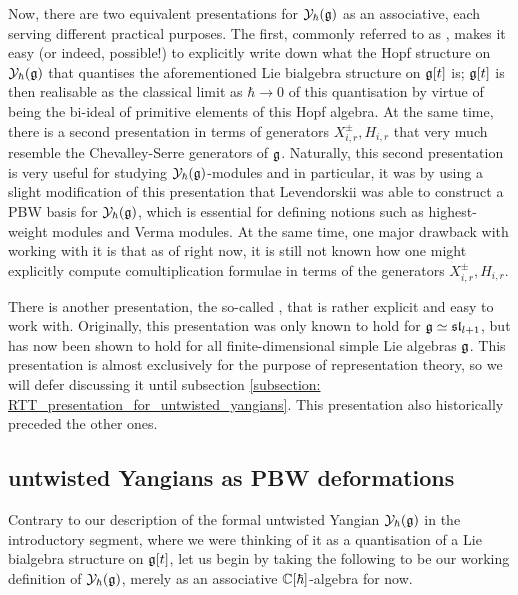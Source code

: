     Now, there are two equivalent presentations for $\mathcal{Y}_{\hbar}(\mathfrak{g})$ as an associative, each serving different practical purposes. The first, commonly referred to as , makes it easy (or indeed, possible!) to explicitly write down what the Hopf structure on $\mathcal{Y}_{\hbar}(\mathfrak{g})$ that quantises the aforementioned Lie bialgebra structure on $\mathfrak{g}[t]$ is; $\mathfrak{g}[t]$ is then realisable as the classical limit as $\hbar \to 0$ of this quantisation by virtue of being the bi-ideal of primitive elements of this Hopf algebra. At the same time, there is a second presentation in terms of generators $X_{i, r}^{\pm}, H_{i, r}$ that very much resemble the Chevalley-Serre generators of $\mathfrak{g}$. Naturally, this second presentation is very useful for studying $\mathcal{Y}_{\hbar}(\mathfrak{g})$-modules and in particular, it was by using a slight modification of this presentation that Levendorskii was able to construct a PBW basis for $\mathcal{Y}_{\hbar}(\mathfrak{g})$, which is essential for defining notions such as highest-weight modules and Verma modules. At the same time, one major drawback with working with it is that as of right now, it is still not known how one might explicitly compute comultiplication formulae in terms of the generators $X_{i, r}^{\pm}, H_{i, r}$. 

    There is another presentation, the so-called , that is rather explicit and easy to work with. Originally, this presentation was only known to hold for $\mathfrak{g} \simeq \mathfrak{sl}_{l + 1}$, but has now been shown to hold for all finite-dimensional simple Lie algebras $\mathfrak{g}$. This presentation is almost exclusively for the purpose of representation theory, so we will defer discussing it until subsection \ref{subsection: RTT_presentation_for_untwisted_yangians}. This presentation also historically preceded the other ones.

    \subsection{untwisted Yangians as PBW deformations}
        Contrary to our description of the formal untwisted Yangian $\mathcal{Y}_{\hbar}(\mathfrak{g})$ in the introductory segment, where we were thinking of it as a quantisation of a Lie bialgebra structure on $\mathfrak{g}[t]$, let us begin by taking the following to be our working definition of $\mathcal{Y}_{\hbar}(\mathfrak{g})$, merely as an associative $\mathbb{C}[\hbar]$-algebra for now.

